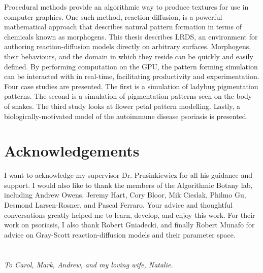 \documentclass{thesis}
\newcommand{\ProgramName}{LRDS}
\theoremstyle{plain}
\theoremstyle{definition}
\begin{document}

  \begin{thesisabstract}  
Procedural methods provide an algorithmic way to produce textures for use in computer graphics. One such method, reaction-diffusion, is a powerful mathematical approach that describes natural pattern formation in terms of chemicals known as morphogens. This thesis describes \ProgramName{}, an environment for authoring reaction-diffusion models directly on arbitrary surfaces. Morphogens, their behaviours, and the domain in which they reside can be quickly and easily defined. By performing computation on the GPU, the pattern forming simulation can be interacted with in real-time, facilitating productivity and experimentation. Four case studies are presented. The first is a simulation of ladybug pigmentation patterns. The second is a simulation of pigmentation patterns seen on the body of snakes. The third study looks at flower petal pattern modelling. Lastly, a biologically-motivated model of the autoimmune disease psoriasis is presented.
  \end{thesisabstract}


  \chapter{Acknowledgements}  
I want to acknowledge my supervisor Dr. Prusinkiewicz for all his guidance and support. I would also like to thank the members of the Algorithmic Botany lab, including Andrew Owens, Jeremy Hart, Cory Bloor, Mik Cieslak, Philmo Gu, Desmond Larsen-Rosner, and Pascal Ferraro. Your advice and thoughtful conversations greatly helped me to learn, develop, and enjoy this work. For their work on psoriasis, I also thank Robert Gniadecki, and finally Robert Munafo for advice on Gray-Scott reaction-diffusion models and their parameter space.

    
  \chapter[Dedication]{}
  \begin{dedication}
    \emph{To Carol, Mark, Andrew, and my loving wife, Natalie.} 
  \end{dedication}
\end{document}
